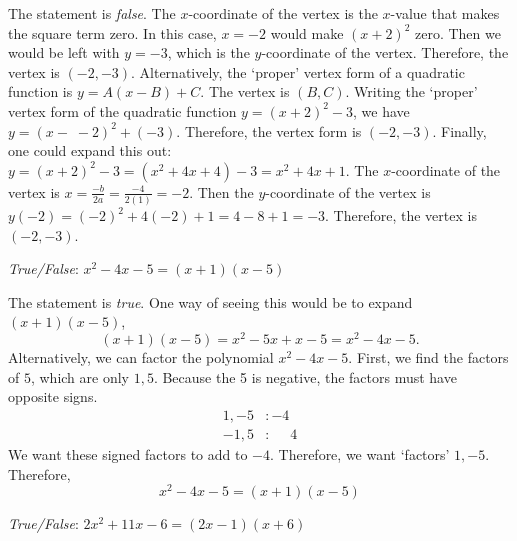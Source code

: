 \documentclass[11pt,letterpaper]{article}
\begin{document}
\sol The statement is \textit{false}. The $x$-coordinate of the vertex is the $x$-value that makes the square term zero. In this case, $x= -2$ would make $(x + 2)^2$ zero. Then we would be left with $y= -3$, which is the $y$-coordinate of the vertex. Therefore, the vertex is $(-2, -3)$. Alternatively, the `proper' vertex form of a quadratic function is $y= A(x - B) + C$. The vertex is $(B, C)$. Writing the `proper' vertex form of the quadratic function $y= (x + 2)^2 - 3$, we have $y= (x - \;-2)^2 + (-3)$. Therefore, the vertex form is $(-2, -3)$. Finally, one could expand this out: $y= (x + 2)^2 - 3= (x^2 + 4x + 4) - 3= x^2 + 4x + 1$. The $x$-coordinate of the vertex is $x= \frac{-b}{2a}= \frac{-4}{2(1)}= -2$. Then the $y$-coordinate of the vertex is $y(-2)= (-2)^2 + 4(-2) + 1= 4 - 8 + 1= -3$. Therefore, the vertex is $(-2, -3)$. \pvspace{1.3cm}



\quizsol \textit{True/False}: $x^2 - 4x - 5= (x + 1)(x - 5)$ \pspace

\sol The statement is \textit{true}. One way of seeing this would be to expand $(x + 1)(x - 5)$,
	\[
	(x + 1)(x - 5)= x^2 - 5x + x - 5= x^2 - 4x - 5.
	\]
Alternatively, we can factor the polynomial $x^2 - 4x - 5$. First, we find the factors of $5$, which are only $1, 5$. Because the 5 is negative, the factors must have opposite signs. 
	\[
	\begin{aligned}
	1, -5&\colon -4 \\
	-1, 5&\colon \phantom{-..}4
	\end{aligned}
	\]
We want these signed factors to add to $-4$. Therefore, we want `factors' $1, -5$. Therefore, 
	\[
	x^2 - 4x - 5= (x + 1)(x - 5)
	\]



\newpage



\quizsol \textit{True/False}: $2x^2 + 11x - 6= (2x - 1)(x + 6)$ \pspace
\end{document}
